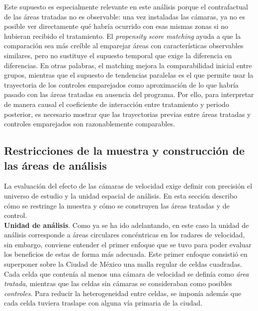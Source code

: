 Este supuesto es especialmente relevante en este análisis porque el contrafactual de las áreas tratadas no es observable: una vez instaladas las cámaras, ya no es posible ver directamente qué habría ocurrido con esas mismas zonas si no hubieran recibido el tratamiento. El \emph{propensity score matching} ayuda a que la comparación sea más creíble al emparejar áreas con características observables similares, pero no sustituye el supuesto temporal que exige la diferencia en diferencias. En otras palabras, el matching mejora la comparabilidad inicial entre grupos, mientras que el supuesto de tendencias paralelas es el que permite usar la trayectoria de los controles emparejados como aproximación de lo que habría pasado con las áreas tratadas en ausencia del programa. Por ello, para interpretar de manera causal el coeficiente de interacción entre tratamiento y periodo posterior, es necesario mostrar que las trayectorias previas entre áreas tratadas y controles emparejados son razonablemente comparables.\\

\subsection{Restricciones de la muestra y construcción de las áreas de análisis}
\noindent La evaluación del efecto de las cámaras de velocidad exige definir con precisión el universo de estudio y la unidad espacial de análisis. En esta sección describo cómo se restringe la muestra y cómo se construyen las áreas tratadas y de control.\\

\textbf{Unidad de análisis}. Como ya se ha ido adelantando, en este caso la unidad de análisis corresponde a áreas circulares concéntricas en los radares de velocidad, sin embargo, conviene entender el primer enfoque que se tuvo para poder evaluar los beneficios de estas de forma más adecuada. Este primer enfoque consistió en superponer sobre la Ciudad de México una malla regular de celdas cuadradas. Cada celda que contenía al menos una cámara de velocidad se definía como \emph{área tratada}, mientras que las celdas sin cámaras se consideraban como posibles \emph{controles}. Para reducir la heterogeneidad entre celdas, se imponía además que cada celda tuviera traslape con alguna vía primaria de la ciudad.\\

